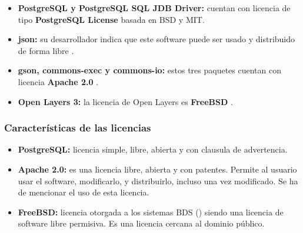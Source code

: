 \begin{itemize}
	\item \textbf{PostgreSQL y PostgreSQL SQL JDB Driver:} cuentan con licencia de tipo \textbf{PostgreSQL License} \cite{licpost:info} basada en BSD y MIT.
	\item \textbf{json:} su desarrollador indica que este software puede ser usado y distribuido de forma libre \cite{licjson:info}.
	\item \textbf{gson, commons-exec y commons-io:} estos tres paquetes cuentan con licencia \textbf{Apache 2.0} \cite{licapa:info}.
	\item \textbf{Open Layers 3:} la licencia de Open Layers es \textbf{FreeBSD} \cite{licbsd:info}.
\end{itemize}

\subsubsection{Características de las licencias}

\begin{itemize}
	\item \textbf{PostgreSQL:} licencia simple, libre, abierta y con clausula de advertencia.
	\item \textbf{Apache 2.0:} es una licencia libre, abierta y con patentes. Permite al usuario usar el software, modificarlo, y distribuirlo, incluso una vez modificado. Se ha de mencionar el uso de esta licencia.
	\item \textbf{FreeBSD:} licencia otorgada a los sistemas BDS () siendo una licencia de software libre permisiva. Es una licencia cercana al dominio público.
\end{itemize}